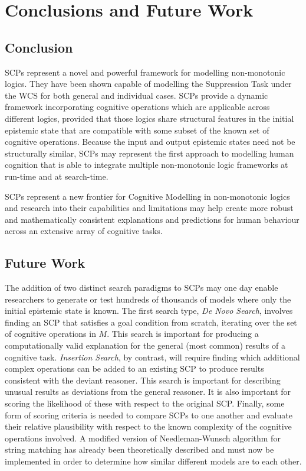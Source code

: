 \documentclass[
11pt, %
english, %
singlespacing, %
headsepline, %
]{MastersDoctoralThesis} %
\begin{document}
\chapter{Conclusions and Future Work}
\section{Conclusion}
SCPs represent a novel and powerful framework for modelling non-monotonic logics. They have been shown capable of modelling the Suppression Task under the WCS for both general and individual cases. SCPs provide a dynamic framework incorporating cognitive operations which are applicable across different logics, provided that those logics share structural features in the initial epistemic state that are compatible with some subset of the known set of cognitive operations. Because the input and output epistemic states need not be structurally similar, SCPs may represent the first approach to modelling human cognition that is able to integrate multiple non-monotonic logic frameworks at run-time and at search-time. 

SCPs represent a new frontier for Cognitive Modelling in non-monotonic logics and research into their capabilities and limitations may help create more robust and mathematically consistent explanations and predictions for human behaviour across an extensive array of cognitive tasks.
\section{Future Work}
The addition of two distinct search paradigms to SCPs may one day enable researchers to generate or test hundreds of thousands of models where only the initial epistemic state is known. The first search type, \textit{De Novo Search}, involves finding an SCP that satisfies a goal condition from scratch, iterating over the set of cognitive operations in $M$. This search is important for producing a computationally valid explanation for the general (most common) results of a cognitive task. \textit{Insertion Search}, by contrast, will require finding which additional complex operations can be added to an existing SCP to produce results consistent with the deviant reasoner. This search is important for describing unusual results as deviations from the general reasoner. It is also important for scoring the likelihood of these with respect to the original SCP. Finally, some form of scoring criteria is needed to compare SCPs to one another and evaluate their relative plausibility with respect to the known complexity of the cognitive operations involved. A modified version of Needleman-Wunsch algorithm for string matching has already been theoretically described and must now be implemented in order to determine how similar different models are to each other.
\end{document}
